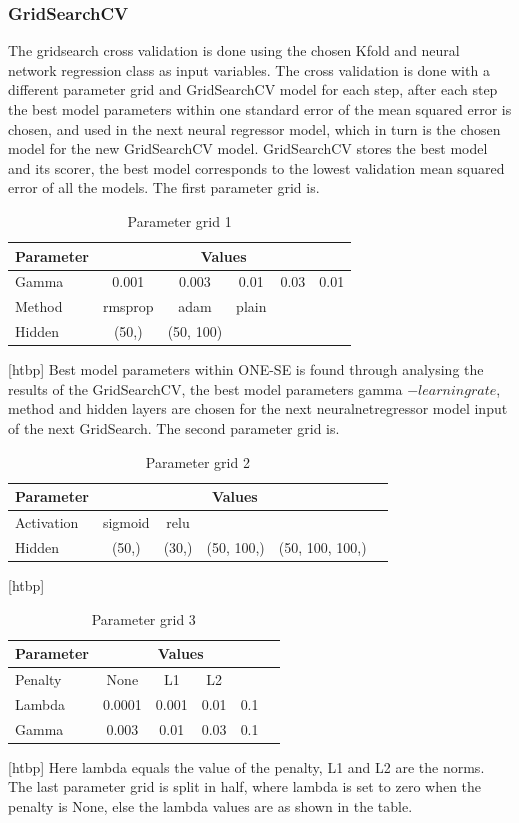 \subsubsection{GridSearchCV}
The gridsearch cross validation is done using the chosen Kfold and neural network regression class
as input variables. The cross validation is done with a different parameter
grid and GridSearchCV model for each step, after each step the best model parameters within one standard error
of the mean squared error is chosen, and used in the next neural regressor model, which in turn is 
the chosen model for the new GridSearchCV model.  
GridSearchCV stores the best model and its scorer, the best model corresponds to the lowest validation mean squared error of all the models.
The first parameter grid is. 
\begin{table}[htbp]
    \centering
    \caption{Parameter grid 1}
    \label{tab:ParamGrid1}
    \begin{tabular}{lccccc}
        \hline
        Parameter & \multicolumn{5}{c}{Values}\\
        \hline
        Gamma  & 0.001 & 0.003 & 0.01 & 0.03 & 0.01\\
        Method & rmsprop & adam & plain \\
        Hidden & (50,) & (50, 100)\\
        \hline
    \end{tabular}
\end{table}[htbp]
Best model parameters within ONE-SE is found through analysing the results of the GridSearchCV,
the best model parameters gamma $- learning rate$, method and hidden layers are chosen for the next
neuralnetregressor model input of the next GridSearch. The second parameter grid is.  
\begin{table}[htbp]
    \centering
    \caption{Parameter grid 2}
    \label{tab:ParamGrid2}
    \begin{tabular}{lccccc}
        \hline
        Parameter & \multicolumn{4}{c}{Values}\\
        \hline
        Activation  & sigmoid & relu\\
        Hidden & (50,) & (30,) & (50, 100,) &(50, 100, 100,)\\
        \hline
    \end{tabular}
\end{table}[htbp]
\begin{table}[htbp]
    \centering
    \caption{Parameter grid 3}
    \label{tab:ParamGrid3}
    \begin{tabular}{lccccc}
        \hline
        Parameter & \multicolumn{4}{c}{Values}\\
        \hline
        Penalty  & None   & L1    & L2 \\
        Lambda   & 0.0001 & 0.001 & 0.01 & 0.1 \\
        Gamma    & 0.003  & 0.01  & 0.03 & 0.1 \\
        \hline
    \end{tabular}
\end{table}[htbp]
Here lambda equals the value of the penalty, L1 and L2 are the norms. 
The last parameter grid is split in half, where lambda is set to zero 
when the penalty is None, else the lambda values are as shown in the table.

